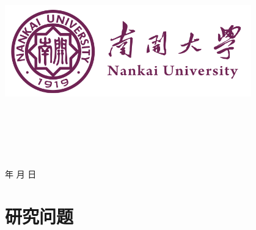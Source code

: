 \documentclass[a4paper]{article}
\newcommand{\HRule}{\rule{\linewidth}{0.5mm}}%
\begin{document}
\renewcommand{\contentsname}{目\ 录}
\renewcommand{\appendixname}{附录}
\renewcommand{\appendixpagename}{附录}
\renewcommand{\refname}{参考文献}
\renewcommand{\figurename}{图}
\renewcommand{\tablename}{表}
\renewcommand{\today}{\number\year 年 \number\month 月 \number\day 日}

\begin{titlepage}
  \begin{center}
    \includegraphics[width=0.8\textwidth]{NKU.png}\\[1cm]
    \vspace{20mm}
    \textbf{\huge\textbf{}}\\[0.5cm]
    \textbf{\huge{}}\\[2.3cm]
    \textbf{\Huge\textbf{}}

    \vspace{\fill}

    \centering
    \textsc{\LARGE {}}\\[0.5cm]
    \textsc{\LARGE {}}\\[0.5cm]
    \textsc{\LARGE {}}\\[0.5cm]

    \vfill
    {\Large \today}
  \end{center}
\end{titlepage}

\renewcommand {\thefigure}{\thesection{}.\arabic{figure}}%
\renewcommand{\figurename}{图}
\renewcommand{\contentsname}{目录}

\clearpage
\tableofcontents
\newpage

\section{研究问题}
\end{document}
